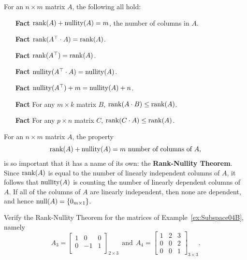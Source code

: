      \begin{tcolorbox}[sharp corners, colback=green!30, colframe=green!80!blue, title=\textbf{\large Useful Properties of Rank and Nullity}]
   For an $n \times m$ matrix $A$, the following all hold: 
    \begin{enumerate}

    \item[{\bf Fact}] $\mathrm{rank}(A) + \mathrm{nullity}(A) =m$, the number of columns in $A$. 

     
      \item[{\bf Fact}] $\mathrm{rank}(A^\top \cdot A)=\mathrm{rank}(A)$.
      

     \item[{\bf Fact}] $\mathrm{rank}(A^\top)=\mathrm{rank}(A)$.
     
           
    \item[{\bf Fact}] $\mathrm{nullity}(A^\top \cdot A)=\mathrm{nullity}(A)$.
    
       \item[{\bf Fact}] $\mathrm{nullity}(A^\top)+ m=\mathrm{nullity}(A) + n$.
       
        \item[{\bf Fact}] For any $m \times k$ matrix $B$, $\mathrm{rank}(A \cdot B) \le  \mathrm{rank}(A)$.
        
        \item[{\bf Fact}] For any $p \times n$ matrix $C$, $\mathrm{rank}(C \cdot A) \le  \mathrm{rank}(A)$.
    \end{enumerate}
    
    \end{tcolorbox}
    
   
  
  \begin{tcolorbox}[title=\textcolor{red}{\Large \bf Rank-Nullity Theorem}]
   For an $n \times m$ matrix $A$, the property
$$\mathrm{rank}(A) + \mathrm{nullity}(A) =m \text{ number of columns of } A,$$ 
is so important that it has a name of its own: the \textbf{Rank-Nullity Theorem}. Since $\mathrm{rank}(A)$ is equal to the number of linearly independent columns of $A$, it follows that $\mathrm{nullity}(A)$ is counting the number of linearly dependent columns of $A$. If all of the columns of $A$ are linearly independent, then none are dependent, and hence $\mathrm{null}(A) = \{ 0_{m \times 1}\}$. 
    \end{tcolorbox}
    
    \vspace*{0.2cm}
    
     \begin{example}
\label{ex:Subspace04E} Verify the Rank-Nullity Theorem for the matrices of Example~\ref{ex:Subspace04B}, namely
$$
    A_3=  \left[\begin{array}{rrc}  1 & 0 & 0 \\  0 & -1 & 1 \\ \end{array} \right]_{2 \times 3}~~\text{and}~~
    A_4=\left[\begin{array}{ccc}  1 & 2 & 3 \\  0 & 0 & 2 \\ 0 & 0 & 1\end{array} \right]_{3 \times 3}. $$
 \end{example}

